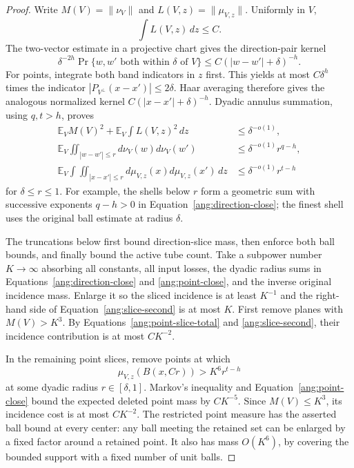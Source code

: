 \begin{proof}
Write $M(V)=\|\nu_V\|$ and $L(V,z)=\|\mu_{V,z}\|$.
Uniformly in $V$,
\begin{equation}\label{ang:point-slice-total}
 \int L(V,z)\,dz\le C.
\end{equation}
The two-vector estimate in a projective chart gives the direction-pair
kernel
\begin{equation}\label{ang:direction-pair-kernel}
 \delta^{-2h}\Pr\{w,w'\text{ both within }\delta\text{ of }V\}
       \le C(|w-w'|+\delta)^{-h}.
\end{equation}
For points, integrate both band indicators in $z$ first. This yields
at most $C\delta^h$ times the indicator
$|P_{V^\perp}(x-x')|\le2\delta$. Haar averaging therefore gives
the analogous normalized kernel $C(|x-x'|+\delta)^{-h}$.
Dyadic annulus summation, using $q,t>h$, proves
\begin{align}
 \mathbb E_V M(V)^2+\mathbb E_V\int L(V,z)^2\,dz
       &\le\delta^{-o(1)},\label{ang:slice-second}\\
 \mathbb E_V\iint_{|w-w'|\le r}d\nu_V(w)d\nu_V(w')
       &\le\delta^{-o(1)}r^{q-h},\label{ang:direction-close}\\
 \mathbb E_V\int\iint_{|x-x'|\le r}
             d\mu_{V,z}(x)d\mu_{V,z}(x')\,dz
       &\le\delta^{-o(1)}r^{t-h}\label{ang:point-close}
\end{align}
for $\delta\le r\le1$. For example, the shells below $r$ form a
geometric sum with successive exponents $q-h>0$ in
Equation~\eqref{ang:direction-close}; the finest shell uses the
original ball estimate at radius $\delta$.

The truncations below first bound direction-slice mass, then enforce
both ball bounds, and finally bound the active tube count. Take a subpower number
$K\to\infty$ absorbing all constants, all input losses, the dyadic
radius sums in Equations~\eqref{ang:direction-close} and
\eqref{ang:point-close}, and the inverse original incidence mass.
Enlarge it so the sliced incidence is at least $K^{-1}$ and the
right-hand side of Equation~\eqref{ang:slice-second} is at most $K$.
First remove planes with $M(V)>K^3$. By
Equations~\eqref{ang:point-slice-total} and \eqref{ang:slice-second},
their incidence contribution is at most $CK^{-2}$.

In the remaining point slices, remove points at which
\[
 \mu_{V,z}(B(x,Cr))>K^6r^{t-h}
\]
at some dyadic radius $r\in[\delta,1]$. Markov's inequality and
Equation~\eqref{ang:point-close} bound the expected deleted point mass
by $CK^{-5}$. Since $M(V)\le K^3$, its incidence cost is at most
$CK^{-2}$. The restricted point measure has the asserted ball bound
at every center: any ball meeting the retained set can be enlarged
by a fixed factor around a retained point. It also has mass $O(K^6)$,
by covering the bounded support with a fixed number of unit balls.


\end{proof}

